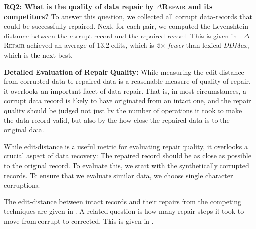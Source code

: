 \documentclass[sigconf,review,anonymous]{acmart}
\newcommand{\dtask}{data repair\xspace}
\newcommand{\approach}{\textsc{$\Delta$Repair}\xspace}
\newcommand{\ddmax}{\textit{DDMax}\xspace}
\newcommand{\drepair}{\approach}
\begin{document}
\noindent\textbf{RQ2: What is the quality of \dtask by \drepair and its competitors?}
To answer this question, we collected all corrupt data-records that could be
successfully repaired. Next, for each pair, we computed the Levenshtein distance
between the corrupt record and the repaired record. This is given in
.
\drepair achieved an average of 13.2 edits,
which is \emph{2$\times$ fewer} than
lexical \ddmax, which is the next best. %


\noindent\textbf{Detailed Evaluation of Repair Quality:}
While measuring the edit-distance from corrupted data to repaired data is a
reasonable measure of quality of repair, it overlooks an important facet
of data-repair. That is, in most circumstances, a corrupt data record is likely
to have originated from an intact one, and the repair quality should be judged
not just by the number of operations it took to make the data-record valid, but
also by the how close the repaired data is to the original data.

While edit-distance is a useful metric for evaluating repair quality,
it overlooks a crucial aspect of data recovery: The repaired record
should be as close as possible to the original record.
To evaluate this, we start with the synthetically corrupted records.
To ensure that we evaluate similar data, we choose single character
corruptions.

The edit-distance between intact records and their repairs from the competing
techniques are given in . A related question 
is how many repair steps it took to move from corrupt to corrected. This
is given in .

% 
% 
% 
% 
\end{document}

